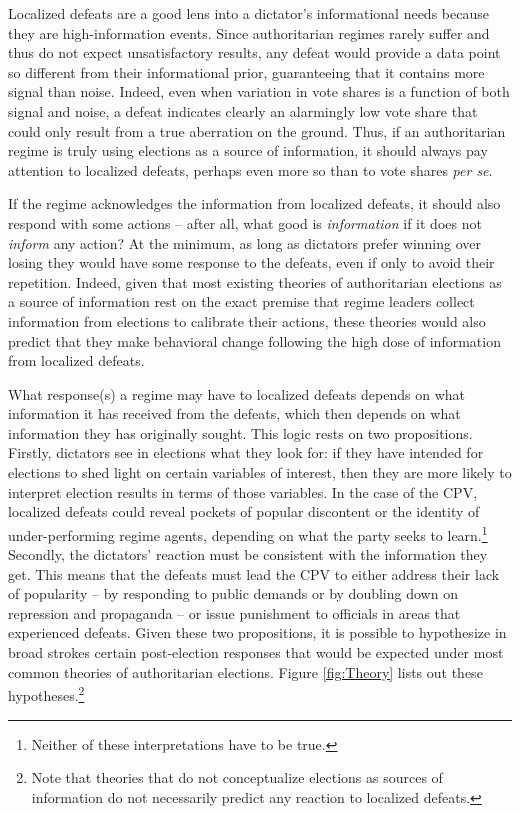 \documentclass[12pt]{article}
\newcommand{\1}{\mathbbm{1}}
\begin{document}
Localized defeats are a good lens into a dictator's informational needs because they are high-information events. Since authoritarian regimes rarely suffer and thus do not expect unsatisfactory results, any defeat would provide a data point so different from their informational prior, guaranteeing that it contains more signal than noise. Indeed, even when variation in vote shares is a function of both signal and noise, a defeat indicates clearly an alarmingly low vote share that could only result from a true aberration on the ground. Thus, if an authoritarian regime is truly using elections as a source of information, it should always pay attention to localized defeats, perhaps even more so than to vote shares \textit{per se}. 

If the regime acknowledges the information from localized defeats, it should also respond with some actions -- after all, what good is \textit{information} if it does not \textit{inform} any action? At the minimum, as long as dictators prefer winning over losing they would have some response to the defeats, even if only to avoid their repetition. Indeed, given that most existing theories of authoritarian elections as a source of information rest on the exact premise that regime leaders collect information from elections to calibrate their actions, these theories would also predict that they make behavioral change following the high dose of information from localized defeats. 

What response(s) a regime may have to localized defeats depends on what information it has received from the defeats, which then depends on what information they has originally sought. This logic rests on two propositions. Firstly, dictators see in elections what they look for: if they have intended for elections to shed light on certain variables of interest, then they are more likely to interpret election results in terms of those variables. In the case of the CPV, localized defeats could reveal pockets of popular discontent or the identity of under-performing regime agents, depending on what the party seeks to learn.\footnote{Neither of these interpretations have to be true.} Secondly, the dictators' reaction must be consistent with the information they get. This means that the defeats must lead the CPV to either address their lack of popularity -- by responding to public demands or by doubling down on repression and propaganda -- or issue punishment to officials in areas that experienced defeats. Given these two propositions, it is possible to hypothesize in broad strokes certain post-election responses that would be expected under most common theories of authoritarian elections. Figure \ref{fig:Theory} lists out these hypotheses.\footnote{Note that theories that do not conceptualize elections as sources of information \citep[e.g][]{AR2005, Cox2009} do not necessarily predict any reaction to localized defeats.}
\end{document}

